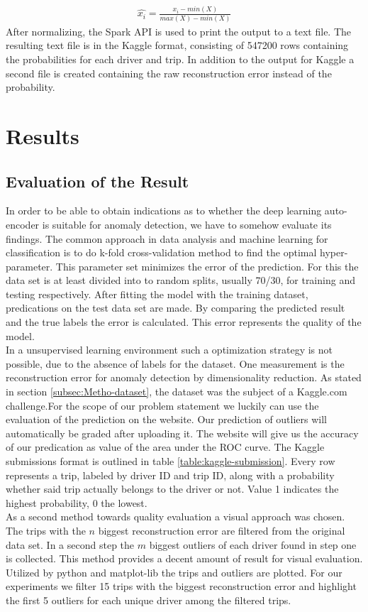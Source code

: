\documentclass{vldb}
\begin{document}
\begin{align}
\hat{x_i} = \frac{x_i - min(X)}{max(X) - min(X)}
\end{align}
After normalizing, the Spark API is used to print the output to a text file. The resulting text file is in the Kaggle format, consisting of 547200 rows containing the probabilities for each driver and trip. In addition to the output for Kaggle a second file is created containing the raw reconstruction error instead of the probability.


\section{Results}
\label{sec:Results}

\subsection{Evaluation of the Result}
\label{subsec:eval-result}
In order to be able to obtain indications as to whether the deep learning auto-encoder is suitable for anomaly detection, we have to somehow evaluate its findings. The common approach in data analysis and machine learning for classification is to do k-fold cross-validation method to find the optimal hyper-parameter. This parameter set minimizes the error of the prediction. For this the data set is at least divided into to random splits, usually 70/30, for training and testing respectively. After fitting the model with the training dataset, predications on the test data set are made. By comparing the predicted result and the true labels the error is calculated. This error represents the quality of the model.\\
In a unsupervised learning environment such a optimization strategy is not possible, due to the absence of labels for the dataset. One measurement is the reconstruction error for anomaly detection by dimensionality reduction. As stated in section \ref{subsec:Metho-dataset}, the dataset was the subject of a Kaggle.com challenge.For the scope of our problem statement we luckily can use the evaluation of the prediction on the website.  Our prediction of outliers will automatically be graded after uploading it. The website will give us the accuracy of our predication as value of the area under the ROC curve. The Kaggle submissions format is outlined in table \ref{table:kaggle-submission}. Every row represents a trip, labeled by driver ID and trip ID, along with a probability whether said trip actually belongs to the driver or not. Value 1 indicates the highest probability, 0 the lowest. \\
As a second method towards quality evaluation a visual approach was chosen. The trips with the $n$ biggest reconstruction error are filtered from the original data set. In a second step the $m$ biggest outliers of each driver found in step one is collected. This method provides a decent amount of result for visual evaluation. Utilized by python and matplot-lib the trips and outliers are plotted. For our experiments we filter 15 trips with the biggest reconstruction error and highlight the first 5 outliers for each unique driver among the filtered trips. \\
 
\end{document}
